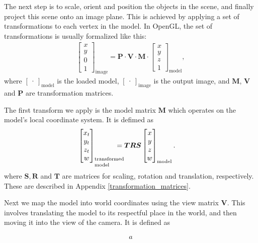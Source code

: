 \documentclass[12pt,journal,draftclsnofoot,onecolumn]{IEEEtran}
\newcommand\bmat[1]{\begin{bmatrix}#1\end{bmatrix}}
\renewcommand\vec[1]{\boldsymbol{#1}}
\newcommand\mat[1]{\boldsymbol{#1}}
\newcommand\1{\vec 1}
\newcommand*\y{\vec y}
\renewcommand*\P{\mat P}
\newcommand*\R{\mat R}
\renewcommand*\P{\mat P}
\newcommand*\V{\mat V}
\newcommand*\M{\mat M}
\begin{document}
The next step is to scale, orient and position the objects in the scene, and finally project this scene onto an image plane. This is achieved by applying a set of transformations to each vertex in the model. In OpenGL, the set of transformations is usually formalized like this:
\begin{align*}
\bmat{x\\y\\0\\1}_\text{image} = \P \cdot \V \cdot \M \cdot \bmat{x\\y\\z\\1}_\text{model},
\end{align*}
where $\bmat{\cdot}_\text{model}$ is the loaded model, $\bmat{\cdot}_\text{image}$ is the output image, and $\M$, $\V$ and $\P$ are transformation matrices.

The first transform we apply is the model matrix $\M$ which operates on the model's local coordinate system. It is defimed as
\begin{align}
\bmat{x_t \\ y_t \\ z_t \\ w}_\text{\parbox{1cm}{\setlength\baselineskip{0.3cm}transformed\\model}} &= \boldsymbol{T}\R\boldsymbol{S} \bmat{x \\ y \\ z \\ w}_\text{model}.
\end{align}
where $\boldsymbol{S}, \R$ and $\boldsymbol{T}$ are matrices for scaling, rotation and translation, respectively. These are described in Appendix \ref{transformation_matrices}. 

Next we map the model into world coordinates using the view matrix $\V$. This involves translating the model to its respectful place in the world, and then moving it into the view of the camera. It is defined as

\begin{align}
a
\end{align}
\end{document}
